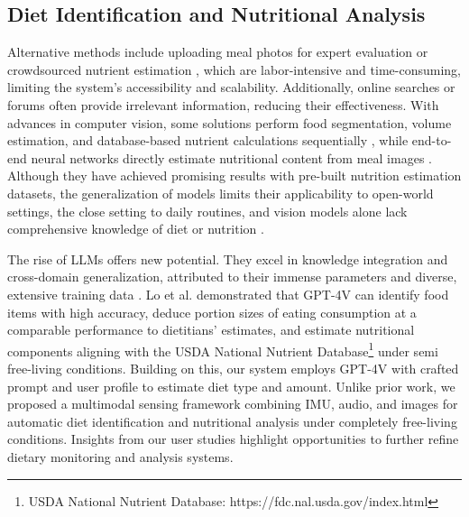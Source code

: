 \subsection{Diet Identification and Nutritional Analysis}
Alternative methods include uploading meal photos for expert evaluation \cite{expertnutritionestimate} or crowdsourced nutrient estimation \cite{crowdsourcingnutritionestimate}, which are labor-intensive and time-consuming, limiting the system's accessibility and scalability. 
Additionally, online searches or forums often provide irrelevant information, reducing their effectiveness.
With advances in computer vision, some solutions perform food segmentation, volume estimation, and database-based nutrient calculations sequentially \cite{foodseg1,foodseg2,foodseg3,foodseg4}, while end-to-end neural networks directly estimate nutritional content from meal images \cite{end2endfood1,end2endfood2,end2endfood3}. 
Although they have achieved promising results with pre-built nutrition estimation datasets, the generalization of models limits their applicability to open-world settings, the close setting to daily routines, and vision models alone lack comprehensive knowledge of diet or nutrition \cite{foodreview}.   

The rise of LLMs offers new potential. They excel in knowledge integration and cross-domain generalization, attributed to their immense parameters and diverse, extensive training data \cite{llmemergence}. 
Lo et al. \cite{lo2024dietary} demonstrated that GPT-4V can identify food items with high accuracy, deduce portion sizes of eating consumption at a comparable performance to dietitians' estimates, and estimate nutritional components aligning with the USDA National Nutrient Database\footnote{USDA National Nutrient Database: https://fdc.nal.usda.gov/index.html} under semi free-living conditions.
Building on this, our \shortname system employs GPT-4V with crafted prompt and user profile to estimate diet type and amount. Unlike prior work, we proposed a multimodal sensing framework combining IMU, audio, and images for automatic diet identification and nutritional analysis under completely free-living conditions. Insights from our user studies highlight opportunities to further refine dietary monitoring and analysis systems.


